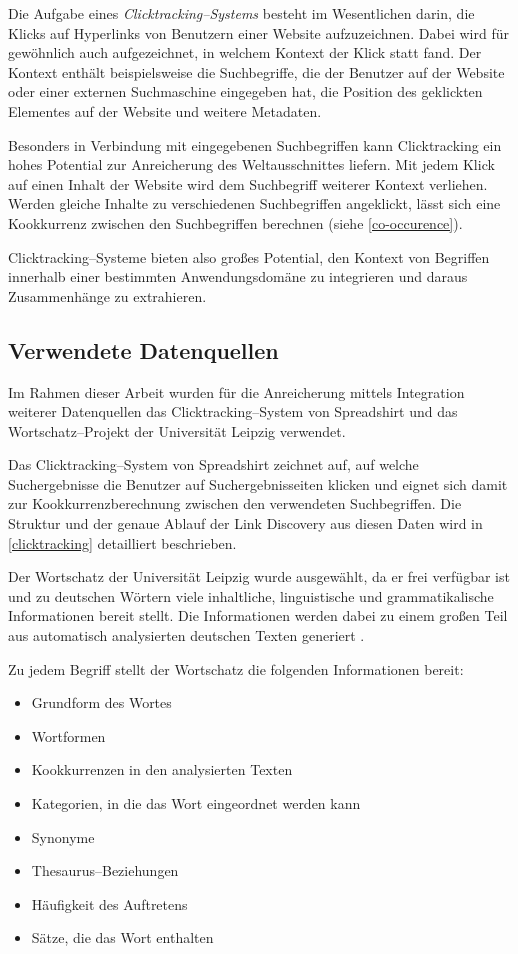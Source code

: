 Die Aufgabe eines \emph{Clicktracking--Systems} besteht im Wesentlichen darin, die Klicks auf Hyperlinks von Benutzern einer Website aufzuzeichnen. Dabei wird für gewöhnlich auch aufgezeichnet, in welchem Kontext der Klick statt fand. Der Kontext enthält beispielsweise die Suchbegriffe, die der Benutzer auf der Website oder einer externen Suchmaschine eingegeben hat, die Position des geklickten Elementes auf der Website und weitere Metadaten.

Besonders in Verbindung mit eingegebenen Suchbegriffen kann Clicktracking ein hohes Potential zur Anreicherung des Weltausschnittes liefern. Mit jedem Klick auf einen Inhalt der Website wird dem Suchbegriff weiterer Kontext verliehen. Werden gleiche Inhalte zu verschiedenen Suchbegriffen angeklickt, lässt sich eine Kookkurrenz zwischen den Suchbegriffen berechnen (siehe \ref{co-occurence}).

Clicktracking--Systeme bieten also großes Potential, den Kontext von Begriffen innerhalb einer bestimmten Anwendungsdomäne zu integrieren und daraus Zusammenhänge zu extrahieren.

\subsection{Verwendete Datenquellen}
\label{used_sources}

Im Rahmen dieser Arbeit wurden für die Anreicherung mittels Integration weiterer Datenquellen das Clicktracking--System von Spreadshirt und das Wortschatz--Projekt der Universität Leipzig verwendet.

Das Clicktracking--System von Spreadshirt zeichnet auf, auf welche Suchergebnisse die  Benutzer auf Suchergebnisseiten klicken und eignet sich damit zur Kookkurrenzberechnung zwischen den verwendeten Suchbegriffen. Die Struktur und der genaue Ablauf der Link Discovery aus diesen Daten wird in \cref{clicktracking} detailliert beschrieben.

Der Wortschatz der Universität Leipzig \cite{ws2013} wurde ausgewählt, da er frei verfügbar ist und zu deutschen Wörtern viele inhaltliche, linguistische und grammatikalische Informationen bereit stellt. Die Informationen werden dabei zu einem großen Teil aus automatisch analysierten deutschen Texten generiert \cite{gh2011}.

Zu jedem Begriff stellt der Wortschatz die folgenden Informationen bereit:

\begin{itemize}
    \item Grundform des Wortes
    \item Wortformen
    \item Kookkurrenzen in den analysierten Texten
    \item Kategorien, in die das Wort eingeordnet werden kann
    \item Synonyme
    \item Thesaurus--Beziehungen
    \item Häufigkeit des Auftretens
    \item Sätze, die das Wort enthalten
\end{itemize}


